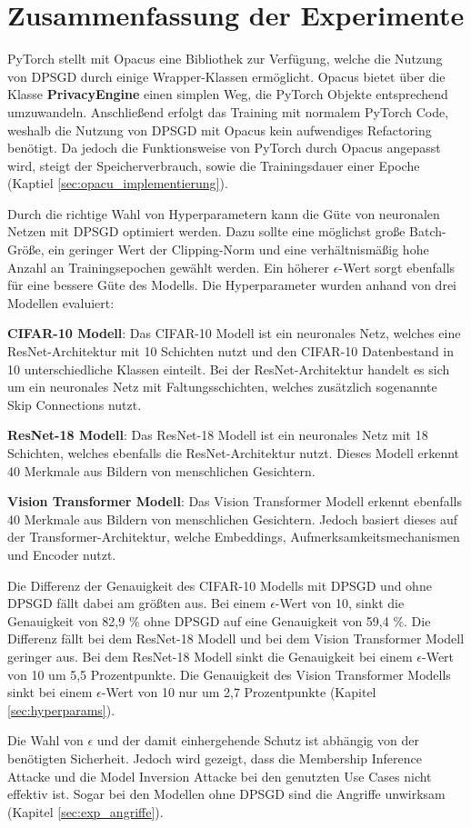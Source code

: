 \section{Zusammenfassung der Experimente}

PyTorch stellt mit Opacus eine Bibliothek zur Verfügung, welche die Nutzung von DPSGD durch einige Wrapper-Klassen ermöglicht.
Opacus bietet über die Klasse \textbf{PrivacyEngine} einen simplen Weg, die PyTorch Objekte entsprechend umzuwandeln. 
Anschließend erfolgt das Training mit normalem PyTorch Code, weshalb die Nutzung von DPSGD mit Opacus kein aufwendiges Refactoring benötigt.
Da jedoch die Funktionsweise von PyTorch durch Opacus angepasst wird, steigt der Speicherverbrauch, sowie die Trainingsdauer einer Epoche (Kaptiel \ref{sec:opacu_implementierung}). 

Durch die richtige Wahl von Hyperparametern kann die Güte von neuronalen Netzen mit DPSGD optimiert werden.
Dazu sollte eine möglichst große Batch-Größe, ein geringer Wert der Clipping-Norm und eine verhältnismäßig hohe Anzahl an Trainingsepochen gewählt werden.
Ein höherer $\epsilon$-Wert sorgt ebenfalls für eine bessere Güte des Modells.
Die Hyperparameter wurden anhand von drei Modellen evaluiert:
\begin{compactitem}
    \item \textbf{CIFAR-10 Modell}: Das CIFAR-10 Modell ist ein neuronales Netz, welches eine ResNet-Architektur mit 10 Schichten nutzt und den CIFAR-10 Datenbestand in 10 unterschiedliche Klassen einteilt. Bei der ResNet-Architektur handelt es sich um ein neuronales Netz mit Faltungsschichten, welches zusätzlich sogenannte Skip Connections nutzt.
    \item \textbf{ResNet-18 Modell}: Das ResNet-18 Modell ist ein neuronales Netz mit 18 Schichten, welches ebenfalls die ResNet-Architektur nutzt. Dieses Modell erkennt 40 Merkmale aus Bildern von menschlichen Gesichtern.
    \item \textbf{Vision Transformer Modell}: Das Vision Transformer Modell erkennt ebenfalls 40 Merkmale aus Bildern von menschlichen Gesichtern.
    Jedoch basiert dieses auf der Transformer-Architektur, welche Embeddings, Aufmerksamkeitsmechanismen und Encoder nutzt.
\end{compactitem}
Die Differenz der Genauigkeit des CIFAR-10 Modells mit DPSGD und ohne DPSGD fällt dabei am größten aus. 
Bei einem $\epsilon$-Wert von 10, sinkt die Genauigkeit von 82,9 \% ohne DPSGD auf eine Genauigkeit von 59,4 \%.
Die Differenz fällt bei dem ResNet-18 Modell und bei dem Vision Transformer Modell geringer aus. 
Bei dem ResNet-18 Modell sinkt die Genauigkeit bei einem $\epsilon$-Wert von 10 um 5,5 Prozentpunkte.
Die Genauigkeit des Vision Transformer Modells sinkt bei einem $\epsilon$-Wert von 10 nur um 2,7 Prozentpunkte (Kapitel \ref{sec:hyperparams}).

Die Wahl von $\epsilon$ und der damit einhergehende Schutz ist abhängig von der benötigten Sicherheit.
Jedoch wird gezeigt, dass die Membership Inference Attacke und die Model Inversion Attacke bei den genutzten Use Cases nicht effektiv ist. 
Sogar bei den Modellen ohne DPSGD sind die Angriffe unwirksam (Kapitel \ref{sec:exp_angriffe}).

